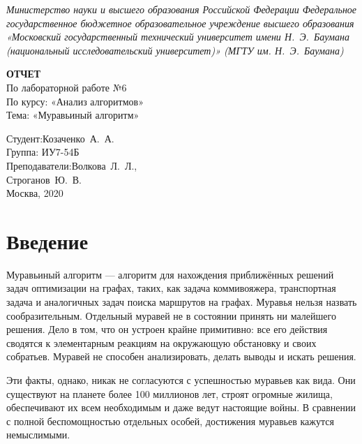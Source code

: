\documentclass[a4paper,14pt]{extreport}
\begin{document}
\begin{titlepage}
	\centering
	
	{\footnotesize\itshape Министерство науки и высшего образования
		Российской Федерации Федеральное государственное бюджетное
		образовательное учреждение высшего образования «Московский
		государственный технический университет имени Н.~Э.~Баумана
		(национальный исследовательский университет)» (МГТУ им. Н.~Э.~Баумана)
		\\}
	
	\vspace{60mm}
	
	\textbf{ОТЧЕТ}\\
	По лабораторной работе №6\\
	По курсу: «Анализ алгоритмов»\\
	Тема: «Муравьиный алгоритм»\\
	
	\vspace{60mm}
	
	\hspace{70mm} Студент:\hfill Козаченко~А.~А.\\
	\hspace{70mm} Группа: \hfill ИУ7-54Б\\
	\hspace{70mm} Преподаватели:\hfill Волкова~Л.~Л.,\\
	\hfill Строганов~Ю.~В.\\
	
	\vfill
	Москва, 2020
\end{titlepage}


\tableofcontents

\chapter*{Введение}

Муравьиный алгоритм — алгоритм для нахождения приближённых решений задач оптимизации на графах, таких, как задача коммивояжера, транспортная задача и аналогичных задач поиска маршрутов на графах.
Муравья нельзя назвать сообразительным.
Отдельный муравей не в состоянии принять ни малейшего решения.
Дело в том, что он устроен крайне примитивно: все его действия сводятся к элементарным реакциям на окружающую обстановку и своих собратьев.
Муравей не способен анализировать, делать выводы и искать решения.

Эти факты, однако, никак не согласуются с успешностью муравьев как вида.
Они существуют на планете более 100 миллионов лет, строят огромные жилища, обеспечивают их всем необходимым и даже ведут настоящие войны.
В сравнении с полной беспомощностью отдельных особей, достижения муравьев кажутся немыслимыми.
\end{document}

